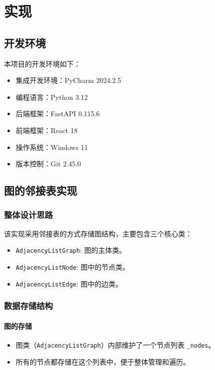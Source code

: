 \documentclass[10pt]{article}
\begin{document}
    \section{实现}

    \subsection{开发环境}
    本项目的开发环境如下：
    \begin{itemize}
        \item 集成开发环境：PyCharm 2024.2.5
        \item 编程语言：Python 3.12
        \item 后端框架：FastAPI 0.115.6
        \item 前端框架：React 18
        \item 操作系统：Windows 11
        \item 版本控制：Git 2.45.0
    \end{itemize}

    \subsection{图的邻接表实现}

    \subsubsection{整体设计思路}
    该实现采用邻接表的方式存储图结构，主要包含三个核心类：
    \begin{itemize}[label=\textbullet]
        \item \texttt{AdjacencyListGraph}: 图的主体类。
        \item \texttt{AdjacencyListNode}: 图中的节点类。
        \item \texttt{AdjacencyListEdge}: 图中的边类。
    \end{itemize}

    \subsubsection{数据存储结构}

    \paragraph{图的存储}
    \begin{itemize}[label=\textbullet]
        \item 图类（\texttt{AdjacencyListGraph}）内部维护了一个节点列表 \texttt{\_nodes}。
        \item 所有的节点都存储在这个列表中，便于整体管理和遍历。
    \end{itemize}
\end{document}
